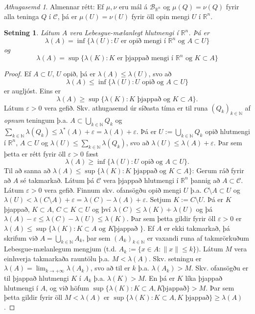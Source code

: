 \documentclass[a4paper,icelandic,11pt]{book}
\theoremstyle{plain}      \newtheorem{setn}{Setning}[chapter]
\theoremstyle{definition} \newtheorem{skilgr}[setn]{Skilgreining}
\theoremstyle{remark}     \newtheorem*{ath}{Athugasemd}
\newcommand{\R}{\mathbb R}
\newcommand{\N}{\mathbb N}
\begin{document}
\begin{ath}
  Almennar rétt: Ef $\mu, \nu$ eru mál á $\mathcal B_{\R^{n}}$ og
  $\mu(Q)=\nu(Q)$ fyrir alla teninga $Q$ í $\mathcal C$, þá er
  $\mu(U)=\nu(U)$ fyrir öll opin mengi $U$ í $\R^{n}$.
\end{ath}
\begin{setn}
  Látum $A$ vera Lebesgue-mælanlegt hlutmengi í $\R^{n}$. Þá er
  \[
  \lambda(A) = \inf\{\lambda(U) : U\text{ er opið mengi í
  }\R^{n}\text{ og } A\subset U \}
  \]
  og
  \[
  \lambda(A) = \sup\{\lambda(K) : K\text{ er þjappað mengi í
  }\R^{n}\text{ og }K\subset A \}
  \]
\end{setn}
\begin{proof}
  Ef $A\subset U$, $U$ opið, þá er $\lambda(A)\le\lambda(U)$, svo að
  \[
  \lambda(A)\le\inf\{\lambda(U) : U\text{ opið og }A\subset U \}
  \]
  er augljóst. Eins er
  \[
  \lambda(A)\ge\sup\{\lambda(K) : K\text{ þjappað og }K\subset A \}.
  \]
  Látum $\varepsilon>0$ vera gefið. Skv. athugasemd úr síðasta tíma er
  til runa $(Q_{k})_{k\in\N}$ af \emph{opnum} teningum
  þ.a. $A\subset\bigcup_{k\in\N}Q_{k}$ og
  $\sum_{k\in\N}\lambda(Q_{k})\le\lambda^{*}(A)+\varepsilon=\lambda(A)+\varepsilon$. Þá
  er $U:=\bigcup_{k\in\N}Q_{k}$ opið hlutmengi í $\R^{n}$,
  $A\subset{U}$ og $\lambda(U)\le\sum_{k\in\N}\lambda(Q_{k})$, svo að
  $\lambda(U)\le\lambda(A)+\varepsilon$. Þar sem þetta er rétt fyrir
  öll $\varepsilon>0$ fæst
  \[
  \lambda(A)\ge\inf\{\lambda(U):U\text{ opið og }A\subset U\}.
  \]
  Til að sanna að $\lambda(A)\le\sup\{\lambda(K):K\text{ þjappað og
  }K\subset A\}$: Gerum ráð fyrir að $A$ sé takmarkað. Látum þá
  $\mathcal C$ vera þjappað hlutmengi í $\R^{n}$ þannig að
  $A\subset\mathcal C$. Látum $\varepsilon>0$ vera gefið. Finnum
  skv. ofansögðu opið mengi $U$ þ.a. $C\setminus A\subset U$ og
  $\lambda(U)<\lambda(C\setminus{A})+\varepsilon=\lambda(C)-\lambda(A)+\varepsilon$. Setjum
  $K:=C\setminus U$. Þá er $K$ þjappað, $K\subset A$, $C\subset
  K\subset U$ og því $\lambda(C)\le\lambda(K)+\lambda(U)$ og þá
  $\lambda(A)-\varepsilon\le\lambda(C)-\lambda(U)\le\lambda(K)$. Þar
  sem þetta gildir fyrir öll $\varepsilon>0$ er
  $\lambda(A)\le\sup\{\lambda(K) : K\subset A \text{ og }K\text{
    þjappað }\}$. Ef $A$ er ekki takmarkað, þá skrifum við
  $A=\bigcup_{k\in\N}A_{k}$, þar sem $(A_{k})_{k\in\N}$ er vaxandi
  runa af takmrörkuðum Lebesgue-mælanlegum mengjum
  (t.d. $A_{k}:=\{x\in A : \|x\|\le k\})$. Látum $M$ vera einhverja
  takmarkaða rauntölu þ.a. $M<\lambda(A)$. Skv. setningu er
  $\lambda(A)=\lim_{k\to+\infty}\lambda(A_{k})$, svo að til er $k$
  þ.a. $\lambda(A_{k})>M$. Skv. ofansögðu er til þjappað hlutmengi $K$
  í $A_{k}$ þ.a. $\lambda(K)>M$. En þá er $K$ líka þjappað hlutmengi í
  $A$, og við höfum $\sup\{\lambda(K) : K\subset A, K\text{
    þjappað}\}>M$. Þar sem þetta gildir fyrir öll $M<\lambda(A)$ er
  $\sup\{\lambda(K):K\subset A, K\text{ þjappað}\}\ge\lambda(A)$.
\end{proof}
\end{document}
